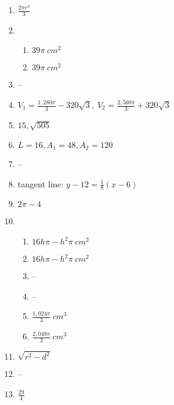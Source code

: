 \documentclass{article}
\begin{document}
\begin{enumerate}
\item $\frac{2 \pi r^3}{3}$

\item

	\begin{enumerate}
	
	\item $39 \pi \ cm^2$
	
	\item $39 \pi \ cm^2$
	
	\end{enumerate}
	
\item --

\item $V_1 = \frac{1,280\pi}{3} - 320\sqrt{3}, \ V_2 = \frac{2,560\pi}{3} + 320\sqrt{3}$

\item $15, \sqrt{505}$

\item $ L = 16, A_1 = 48, A_2 = 120$

\item --

\item tangent line: $y - 12 = \frac{1}{8}(x-6)$

\item $2\pi - 4$

\item

	\begin{enumerate}
	
	\item $16 h \pi - h^2 \pi \ cm^2$
	
	\item $ 16 h \pi  - h^2 \pi \ cm^2$
	
	\item --
	
	\item --
	
	\item $\frac{1,024\pi}{3} \ cm^3$
	
	\item $\frac{2,048\pi}{3} \ cm^3$
	
	\end{enumerate}
	
\item $\sqrt{r^2 - d^2}$

\item --

\item $ \frac{29}{4}$


\end{enumerate}
\end{document}
